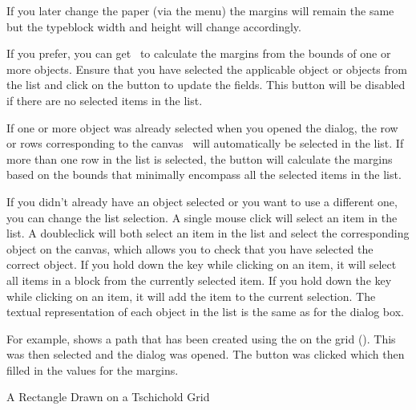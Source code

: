 If you later change the paper (via the  menu)
the margins will remain the same but the \gls{typeblock} width and
height will change accordingly.

If you prefer, you can get \FlowframTk\ to
calculate the margins from the bounds of one or more \glspl{object}.
Ensure that you have selected the applicable object or objects
from the  list and click on the
 button to update the
 fields. This button will be
disabled if there are no selected items in the  list.


If one or more \gls{object} was already selected when you opened the
 dialog, the row or rows corresponding to the
\gls*{canvas} \selection\ will automatically be selected in the
 list. If more than one row in the
list is selected, the  button
will calculate the margins based on the bounds that minimally
encompass all the selected items in the list.

If you didn't already have an object selected or you want to use a
different one, you can change the list selection.  A single mouse
\gls{click} will select an item in the list.  A \gls{doubleclick}
will both select an item in the list and select the corresponding
\gls{object} on the \gls{canvas}, which allows you to check that
you have selected the correct object.  If you hold down the
 key while clicking on an item, it will select
all items in a block from the currently selected item.  If you hold
down the  key while clicking on an item, it will
add the item to the current selection.
The textual representation of each \gls{object} in the list is the
same as for the  dialog box. 

For example,  shows a \gls*{path} that
has been created using the  on the
 grid (). This was then selected and the
 dialog was opened. The
 button was clicked
which then filled in the values for the margins.

{}
{A Rectangle Drawn on a Tschichold Grid}

